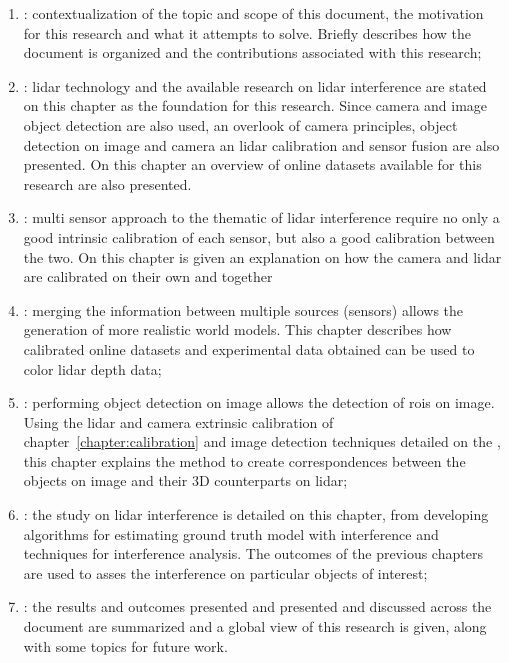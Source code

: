 \begin{enumerate}[label={\textbf{Chapter \arabic* -}}, align=left, itemindent=\leftmargini]
	\item \textit{}: contextualization of the topic and scope of this document, the motivation for this research and what it attempts to solve. Briefly describes how the document is organized and the contributions associated with this research;
	\item \textit{}: \ac{lidar} technology and the available research on \ac{lidar} interference are stated on this chapter as the foundation for this research. Since camera and image object detection are also used, an overlook of camera principles, object detection on image and camera an \ac{lidar} calibration and sensor fusion are also presented. On this chapter an overview of online datasets available for this research are also presented.
	\item \textit{}: multi sensor approach to the thematic of \ac{lidar} interference require no only a good intrinsic calibration of each sensor, but also a good calibration between the two. On this chapter is given an explanation on how the camera and \ac{lidar} are calibrated on their own and together
	\item \textit{}: merging the information between multiple sources (sensors) allows the generation of more realistic world models. This chapter describes how calibrated online datasets and experimental data obtained can be used to color \ac{lidar} depth data;
	\item \textit{}: performing object detection on image allows the detection of \aclp{roi} on image. Using the \ac{lidar} and camera extrinsic calibration of chapter~\ref{chapter:calibration} and image detection techniques detailed on the , this chapter explains the method to create correspondences between the objects on image and their 3D counterparts on \ac{lidar};
	\item \textit{}: the study on \ac{lidar} interference is detailed on this chapter, from developing algorithms for estimating ground truth model with interference and techniques for interference analysis. The outcomes of the previous chapters are used to asses the interference on particular objects of interest;
	\item \textit{}: the results and outcomes presented and presented and  discussed across the document are summarized and a global view of this research is given, along with some topics for future work.
\end{enumerate}

